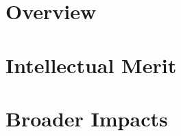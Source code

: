 \documentclass[fontsize=10pt,paper=letter,twoside=false,onecolumn,
  headings=small]{scrartcl} %
\begin{document}
\noindent{\bfseries{}}
\section*{Overview}%

\section*{Intellectual Merit}

\section*{Broader Impacts}
\end{document}
